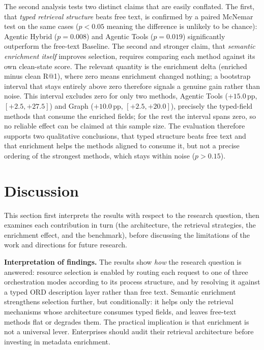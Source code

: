 \documentclass[10pt,twocolumn]{article}
\begin{document}
The second analysis tests two distinct claims that are easily conflated. The first, that \emph{typed retrieval structure} beats free text, is confirmed by a paired McNemar test on the same cases ($p<0.05$ meaning the difference is unlikely to be chance): Agentic Hybrid ($p=0.008$) and Agentic Tools ($p=0.019$) significantly outperform the free-text Baseline. The second and stronger claim, that \emph{semantic enrichment itself} improves selection, requires comparing each method against its own clean-state score. The relevant quantity is the enrichment delta (enriched minus clean R@1), where zero means enrichment changed nothing; a bootstrap interval that stays entirely above zero therefore signals a genuine gain rather than noise. This interval excludes zero for only two methods, Agentic Tools ($+15.0$\,pp, $[+2.5, +27.5]$) and Graph ($+10.0$\,pp, $[+2.5, +20.0]$), precisely the typed-field methods that consume the enriched fields; for the rest the interval spans zero, so no reliable effect can be claimed at this sample size. The evaluation therefore supports two qualitative conclusions, that typed structure beats free text and that enrichment helps the methods aligned to consume it, but not a precise ordering of the strongest methods, which stays within noise ($p>0.15$).

\section{Discussion}
\label{sec:discussion}

This section first interprets the results with respect to the research question, then examines each contribution in turn (the architecture, the retrieval strategies, the enrichment effect, and the benchmark), before discussing the limitations of the work and directions for future research.

\textbf{Interpretation of findings.} The results show \emph{how} the research question is answered: resource selection is enabled by routing each request to one of three orchestration modes according to its process structure, and by resolving it against a typed ORD description layer rather than free text. Semantic enrichment strengthens selection further, but conditionally: it helps only the retrieval mechanisms whose architecture consumes typed fields, and leaves free-text methods flat or degrades them. The practical implication is that enrichment is not a universal lever. Enterprises should audit their retrieval architecture before investing in metadata enrichment.
\end{document}
